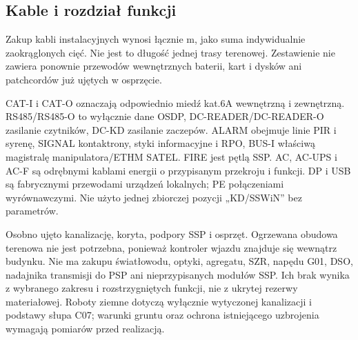 \subsection{Kable i rozdział funkcji}
Zakup kabli instalacyjnych wynosi łącznie \CableTotal{} m, jako suma indywidualnie zaokrąglonych cięć. Nie jest to długość jednej trasy terenowej. Zestawienie nie zawiera ponownie przewodów wewnętrznych baterii, kart i dysków ani patchcordów już ujętych w osprzęcie.

\CableBom

CAT-I i CAT-O oznaczają odpowiednio miedź kat.6A wewnętrzną i zewnętrzną. RS485/RS485-O to wyłącznie dane OSDP, DC-READER/DC-READER-O zasilanie czytników, DC-KD zasilanie zaczepów. ALARM obejmuje linie PIR i syrenę, SIGNAL kontaktrony, styki informacyjne i RPO, BUS-I właściwą magistralę manipulatora/ETHM SATEL. FIRE jest pętlą SSP. AC, AC-UPS i AC-F są odrębnymi kablami energii o przypisanym przekroju i funkcji. DP i USB są fabrycznymi przewodami urządzeń lokalnych; PE połączeniami wyrównawczymi. Nie użyto jednej zbiorczej pozycji „KD/SSWiN” bez parametrów.

Osobno ujęto kanalizację, koryta, podpory SSP i osprzęt. Ogrzewana obudowa terenowa nie jest potrzebna, ponieważ kontroler wjazdu znajduje się wewnątrz budynku. Nie ma zakupu światłowodu, optyki, agregatu, SZR, napędu G01, DSO, nadajnika transmisji do PSP ani nieprzypisanych modułów SSP. Ich brak wynika z wybranego zakresu i rozstrzygniętych funkcji, nie z ukrytej rezerwy materiałowej. Roboty ziemne dotyczą wyłącznie wytyczonej kanalizacji i podstawy słupa C07; warunki gruntu oraz ochrona istniejącego uzbrojenia wymagają pomiarów przed realizacją.
